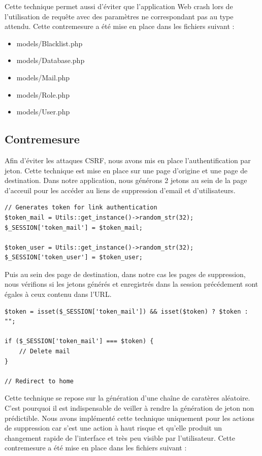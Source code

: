 \documentclass[12pt]{article}
\begin{document}
Cette technique permet aussi d'éviter que l'application Web crash lors de l'utilisation de requête avec des paramètres ne correspondant pas au type attendu.
Cette contremesure a été mise en place dans les fichiers suivant :

\begin{itemize}
\item models/Blacklist.php
\item models/Database.php
\item models/Mail.php
\item models/Role.php
\item models/User.php
\end{itemize}

\newpage
\subsection{Contremesure}\label{c4_1}

Afin d'éviter les attaques CSRF, nous avons mis en place l'authentification par jeton. Cette technique est mise en place sur une page d'origine et une page de destination.
Dans notre application, nous générons 2 jetons au sein de la page d'acceuil pour les accéder au liens de suppression d'email et d'utilisateurs.

\begin{lstlisting}[style=JAVA]
// Generates token for link authentication
$token_mail = Utils::get_instance()->random_str(32);
$_SESSION['token_mail'] = $token_mail;

$token_user = Utils::get_instance()->random_str(32);
$_SESSION['token_user'] = $token_user;
\end{lstlisting}

Puis au sein des page de destination, dans notre cas les pages de suppression, nous vérifions si les jetons générés et enregistrés dans la session précédement sont égales à ceux contenu dans l'URL.

\begin{lstlisting}[style=JAVA]
$token = isset($_SESSION['token_mail']) && isset($token) ? $token : "";

if ($_SESSION['token_mail'] === $token) {
    // Delete mail
}

// Redirect to home
\end{lstlisting}

Cette technique se repose sur la génération d'une chaîne de caratères aléatoire. C'est pourquoi il est indispensable de veiller à rendre la génération de jeton non prédictible. Nous avons implémenté cette technique uniquement pour les actions de suppression car s'est une action à haut risque et qu'elle produit un changement rapide de l'interface et très peu visible par l'utilisateur. 
Cette contremesure a été mise en place dans les fichiers suivant :
\end{document}
